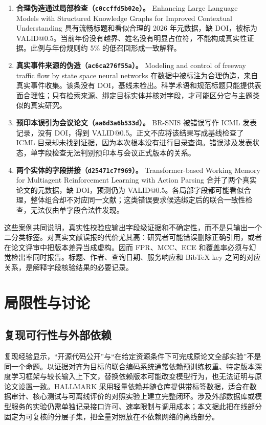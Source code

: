\documentclass[UTF8,a4paper,11pt]{ctexart}
\begin{document}
\begin{enumerate}[label=\arabic*.]
\item \textbf{合理伪造通过局部检查（\texttt{c0ccffd5b02e}）。} Enhancing Large Language Models with Structured Knowledge Graphs for Improved Contextual Understanding 具有流畅标题和看似合理的 2026 年元数据，缺 DOI，被标为 VALID@0.5。当前年份没有越界、姓名没有明显占位符，不能构成真实性证据。此例与年份规则约 5\% 的低召回形成一致解释。
\item \textbf{真实事件来源的伪造（\texttt{ac6ca276f55a}）。} Modeling and control of freeway traffic flow by state space neural networks 在数据中被标注为合理伪造，来自真实事件收集。该条没有 DOI，基线未检出。科学术语和规范标题只能提供表面合理性；只有检索来源、绑定目标实体并核对字段，才可能区分它与主题类似的真实研究。
\item \textbf{预印本误引为会议论文（\texttt{aa6d3a6b533d}）。} BR-SNIS 被错误写作 ICML 发表记录，没有 DOI，得到 VALID@0.5。正文不应将该结果写成基线检查了 ICML 目录却未找到证据，因为本次根本没有进行目录查询。错误涉及发表状态，单字段检查无法判别预印本与会议正式版本的关系。
\item \textbf{两个实体的字段拼接（\texttt{d25471c7f969}）。} Transformer-based Working Memory for Multiagent Reinforcement Learning with Action Parsing 合并了两个真实论文的元数据，缺 DOI，预测仍为 VALID@0.5。各局部字段都可能看似合理，整体组合却不对应同一文献；这类错误要求候选绑定后的联合一致性检查，无法仅由单字段合法性发现。
\end{enumerate}

这些案例共同说明，真实性校验应输出字段级证据和不确定性，而不是只输出一个二分类标签。对真实文献误报的代价尤其高：研究者可能错误删除正确引用，或者在论文评审中把版本差异当成虚构。因而 FPR、MCC、ECE 和覆盖率必须与幻觉检出率同时报告。标题、作者、查询日期、服务响应和 BibTeX key 之间的对应关系，是解释字段核验结果的必要记录。

\section{局限性与讨论}

\subsection{复现可行性与外部依赖}

复现经验显示，“开源代码公开”与“在给定资源条件下可完成原论文全部实验”不是同一个命题。以证据对齐为目标的联合编码系统通常依赖预训练权重、特定版本深度学习框架与较长输入上下文，替换依赖版本可能改变模型行为，也无法证明与原论文设置一致。HALLMARK 采用轻量依赖并随仓库提供带标签数据，适合在数据审计、核心测试与可离线评价的对照实验上建立完整闭环。涉及外部数据库或模型服务的实验仍需单独记录接口许可、速率限制与调用成本；本文据此把在线部分固定为可复核的分层子集，把全量对照放在不依赖网络的离线部分。
\end{document}

